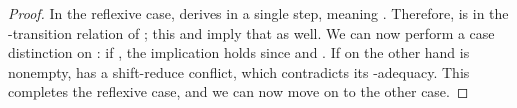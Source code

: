 \begin{isabellebody}
\begin{isamarkuptext}
\begin{lemma}
\begin{proof}
In the reflexive case,  derives  in a single step, meaning 
.
Therefore,  is in the \isa{{\isasymepsilon}}-transition relation of 
; this and  imply that 
 as well. We can now perform a case distinction on : if 
, the implication holds since  and
. If on the other hand  is nonempty,  has a shift-reduce conflict, which
contradicts its -adequacy. This completes the reflexive case, and we can now move on to the 
other case.


\end{proof}
\end{lemma}
\end{isamarkuptext}
\end{isabellebody}

